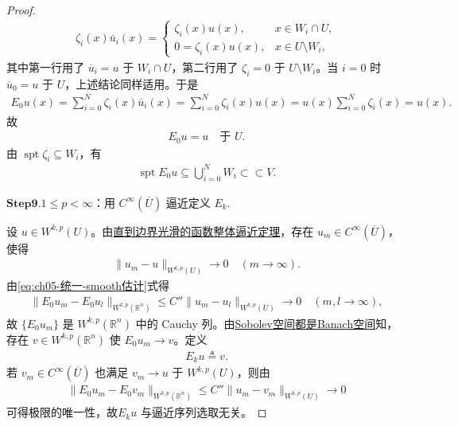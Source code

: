 \documentclass[../../main.tex]{subfiles}
\begin{document}
\begin{proof}
\begin{align*}
\zeta_i(x)\overline{u}_i(x)=
\begin{cases}
\zeta_i(x)u(x), & x\in W_i\cap U,\\
0=\zeta_i(x)u(x), & x\in U\setminus W_i,
\end{cases}
\end{align*}
其中第一行用了 $\overline{u}_i=u$ 于 $W_i\cap U$，第二行用了 $\zeta_i=0$ 于 $U\setminus W_i$。当 $i=0$ 时 $\overline{u}_0=u$ 于 $U$，上述结论同样适用。于是
\begin{align*}
E_0u(x)
=\sum\limits_{i=0}^{N}\zeta_i(x)\overline{u}_i(x)
=\sum\limits_{i=0}^{N}\zeta_i(x)u(x)=u(x)\sum\limits_{i=0}^{N}\zeta_i(x)
=u(x).
\end{align*}
故
\begin{align}
E_0u=u\quad\text{于 }U.
\label{eq:ch05-统一-等于u}
\end{align}
由 $\operatorname{spt}\zeta_i\subseteq W_i$，有
\begin{align}
\operatorname{spt}E_0u\subseteq\bigcup_{i=0}^{N}W_i\subset\subset V.
\label{eq:ch05-统一-支集}
\end{align}

\noindent$\mathbf{Step}\bm{9}$.{\heiti $1\leqslant p<\infty$：用 $C^{\infty}(\overline{U})$ 逼近定义 $E_k$.}

设 $u\in W^{k,p}(U)$。由\hyperref[theorem:ch05-直到边界光滑的函数整体逼近定理]{直到边界光滑的函数整体逼近定理}，存在 $u_m\in C^{\infty}(\overline{U})$，使得
\begin{align*}
\|u_m-u\|_{W^{k,p}(U)}\longrightarrow0\quad(m\to\infty).
\end{align*}
由\eqref{eq:ch05-统一-smooth估计}式得
\begin{align*}
\|E_0u_m-E_0u_l\|_{W^{k,p}(\mathbb{R}^{n})}
\leqslant C''\|u_m-u_l\|_{W^{k,p}(U)}\longrightarrow0\quad(m,l\to\infty),
\end{align*}
故 $\{E_0u_m\}$ 是 $W^{k,p}(\mathbb{R}^{n})$ 中的 Cauchy 列。由\hyperref[theorem:ch05-WkpBanach]{Sobolev空间都是Banach空间}知，存在 $v\in W^{k,p}(\mathbb{R}^{n})$ 使 $E_0u_m\to v$。定义
\begin{align*}
E_ku\triangleq v.
\end{align*}
若 $v_m\in C^{\infty}(\overline{U})$ 也满足 $v_m\to u$ 于 $W^{k,p}(U)$，则由
\begin{align*}
\|E_0u_m-E_0v_m\|_{W^{k,p}(\mathbb{R}^{n})}
\leqslant C''\|u_m-v_m\|_{W^{k,p}(U)}\longrightarrow0
\end{align*}
可得极限的唯一性，故$E_ku$ 与逼近序列选取无关。


\end{proof}
\end{document}
